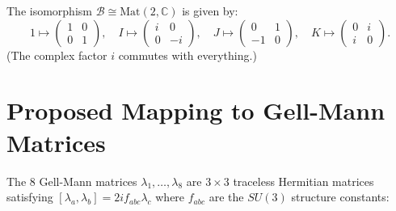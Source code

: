 \documentclass[12pt,a4paper]{article}
\theoremstyle{definition}
\theoremstyle{remark}
\begin{document}
The isomorphism $\mathcal{B} \cong \mathrm{Mat}(2,\mathbb{C})$ is given by:
\begin{equation}
  1 \mapsto \begin{pmatrix}1&0\\0&1\end{pmatrix}, \quad
  I \mapsto \begin{pmatrix}i&0\\0&-i\end{pmatrix}, \quad
  J \mapsto \begin{pmatrix}0&1\\-1&0\end{pmatrix}, \quad
  K \mapsto \begin{pmatrix}0&i\\i&0\end{pmatrix}.
  \label{eq:iso}
\end{equation}
(The complex factor $i$ commutes with everything.)

\section{Proposed Mapping to Gell-Mann Matrices}
\label{sec:mapping}

The 8 Gell-Mann matrices $\lambda_1,\ldots,\lambda_8$ are $3\times 3$
traceless Hermitian matrices satisfying
$[\lambda_a,\lambda_b] = 2if_{abc}\lambda_c$
where $f_{abc}$ are the $SU(3)$ structure constants:
\end{document}

